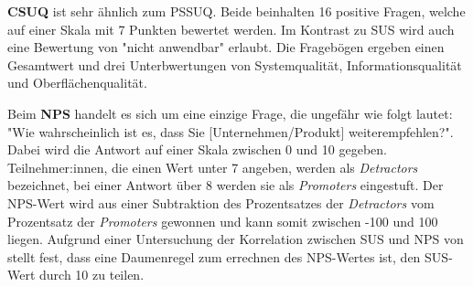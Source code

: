 \textbf{\ac{CSUQ}} ist sehr ähnlich zum \ac{PSSUQ}. Beide beinhalten 16 positive Fragen, welche auf
einer Skala mit 7 Punkten bewertet werden. Im Kontrast zu \ac{SUS} wird auch eine Bewertung von
"nicht anwendbar" erlaubt. Die Fragebögen ergeben einen Gesamtwert und drei Unterbwertungen von
Systemqualität, Informationsqualität und Oberflächenqualität. \parencite{barnumUsabilityTesting2021}

Beim \textbf{\ac{NPS}} handelt es sich um eine einzige Frage, die ungefähr wie folgt lautet: "Wie
wahrscheinlich ist es, dass Sie [Unternehmen/Produkt] weiterempfehlen?". Dabei wird die Antwort auf
einer Skala zwischen 0 und 10 gegeben. Teilnehmer:innen, die einen Wert unter 7 angeben, werden als
\textit{Detractors} bezeichnet, bei einer Antwort über 8 werden sie als \textit{Promoters}
eingestuft. Der \ac{NPS}-Wert wird aus einer Subtraktion des Prozentsatzes der \textit{Detractors}
vom Prozentsatz der \textit{Promoters} gewonnen und kann somit zwischen -100 und 100 liegen.
 Aufgrund einer Untersuchung der Korrelation zwischen \ac{SUS} und
\ac{NPS} von \textcite{sauroDoesBetter2010} stellt \textcite{barnumUsabilityTesting2021} fest, dass
eine Daumenregel zum errechnen des \ac{NPS}-Wertes ist, den \ac{SUS}-Wert durch 10 zu teilen.
